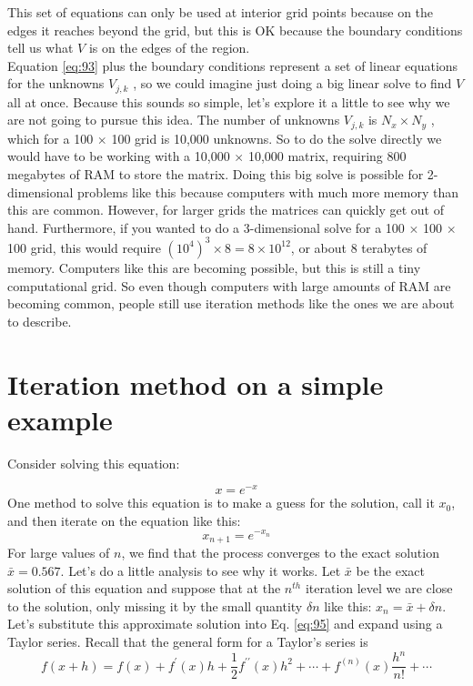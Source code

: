 This set of equations can only be used at interior grid points because on the edges
it reaches beyond the grid, but this is OK because the boundary conditions tell us
what $V$ is on the edges of the region.
\\
Equation \ref{eq:93} plus the boundary conditions represent a set of linear equations for the unknowns $V_{j,k}$ , so we could imagine just doing a big linear solve to
find $V$ all at once. Because this sounds so simple, let\rq s explore it a little to see why
we are not going to pursue this idea. The number of unknowns $V_{j,k}$ is $N_x × N_y$ ,
which for a 100 $×$ 100 grid is 10,000 unknowns. So to do the solve directly we would
have to be working with a 10,000 $×$ 10,000 matrix, requiring 800 megabytes of RAM
to store the matrix. Doing this big solve is possible for 2-dimensional problems
like this because computers with much more memory than this are common.
However, for larger grids the matrices can quickly get out of hand. Furthermore,
if you wanted to do a 3-dimensional solve for a 100 $×$ 100 $×$ 100 grid, this would
require $(10^4)^3 × 8 = 8 × 10^{12}$, or about 8 terabytes of memory. Computers like this
are becoming possible, but this is still a tiny computational grid. So even though
computers with large amounts of RAM are becoming common, people still use
iteration methods like the ones we are about to describe.

\section*{Iteration method on a simple example}
Consider solving this equation:

\begin{equation}\label{eq:94}
x = e^{-x}
\end{equation}
One method to solve this equation is to make a guess for the solution, call it $x_0$,
and then iterate on the equation like this:
\begin{equation}\label{eq:95}
x_{n+1}=e^{-x_{n}}
\end{equation}
For large values of $n$, we find that the process converges to the exact solution
$ \bar{x} = 0.567$. Let\rq s do a little analysis to see why it works. Let $\bar{x}$ be the exact solution
of this equation and suppose that at the $n^{th}$ iteration level we are close to the
solution, only missing it by the small quantity $\delta n$ like this: $x_n = \bar{x} + \delta n$. Let\rq s
substitute this approximate solution into Eq. \ref{eq:95} and expand using a Taylor
series. Recall that the general form for a Taylor\rq s series is
\begin{equation}\label{eq:96}
f(x+h)=f(x)+f^{\prime}(x) h+\frac{1}{2} f^{\prime \prime}(x) h^{2}+\cdots+f^{(n)}(x) \frac{h^{n}}{n !}+\cdots
\end{equation}

